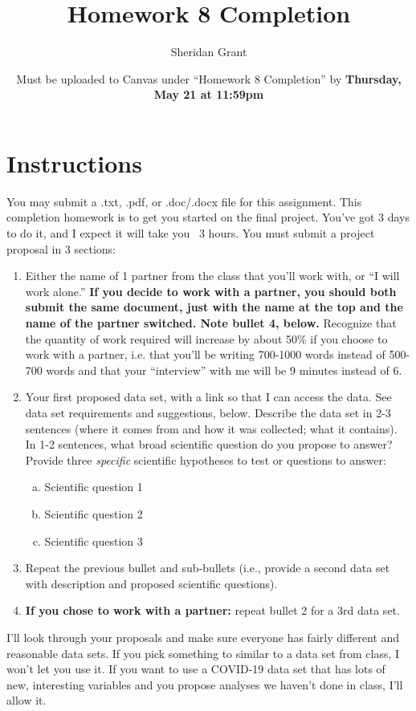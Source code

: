\documentclass[12pt]{article}
\title{Homework 8 Completion}
\author{Sheridan Grant}
\date{Must be uploaded to Canvas under ``Homework 8 Completion'' by \textbf{Thursday, May 21 at 11:59pm}}
\begin{document}
\sloppy

\maketitle

\section*{Instructions}

You may submit a .txt, .pdf, or .doc/.docx file for this assignment. This completion homework is to get you started on the final project. You've got 3 days to do it, and I expect it will take you ~3 hours. You must submit a project proposal in 3 sections:
\begin{enumerate}
	\item Either the name of 1 partner from the class that you'll work with, or ``I will work alone.'' \textbf{If you decide to work with a partner, you should both submit the same document, just with the name at the top and the name of the partner switched. Note bullet 4, below.} Recognize that the quantity of work required will increase by about 50\% if you choose to work with a partner, i.e. that you'll be writing 700-1000 words instead of 500-700 words and that your ``interview'' with me will be 9 minutes instead of 6.
	\item Your first proposed data set, with a link so that I can access the data. See data set requirements and suggestions, below. Describe the data set in 2-3 sentences (where it comes from and how it was collected; what it contains). In 1-2 sentences, what broad scientific question do you propose to answer? Provide three \textit{specific} scientific hypotheses to test or questions to answer:
	\begin{enumerate}[(a)]
		\item Scientific question 1
		\item Scientific question 2
		\item Scientific question 3
	\end{enumerate}
	\item Repeat the previous bullet and sub-bullets (i.e., provide a second data set with description and proposed scientific questions).
	\item \textbf{If you chose to work with a partner:} repeat bullet 2 for a 3rd data set.
\end{enumerate}

I'll look through your proposals and make sure everyone has fairly different and reasonable data sets. If you pick something to similar to a data set from class, I won't let you use it. If you want to use a COVID-19 data set that has lots of new, interesting variables and you propose analyses we haven't done in class, I'll allow it.
\end{document}
